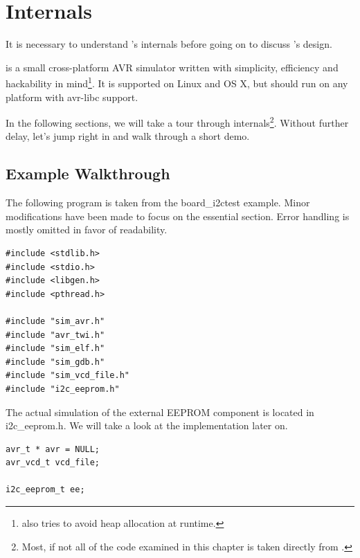 
\chapter{\simavr Internals} \label{chapter:simavr}

It is necessary to understand \simavr's internals before going on to discuss
\qsimavr's design.

\simavr is a small cross-platform \ac{AVR} simulator written with simplicity, efficiency and
hackability in mind\footnote{
%
\simavr also tries to avoid heap allocation at runtime.
%
}. It is supported on Linux and OS X, but should run on any
platform with avr-libc support.

In the following sections, we will take a tour through \simavr internals\footnote{
Most, if not all of the code examined in this chapter is taken directly from \simavr.}.
Without further delay, let's jump right in and walk through a short demo.


\section{\simavr Example Walkthrough} \label{section:simavr_example_walkthrough}

The following program is taken from the board\_i2ctest \simavr example. Minor
modifications have been made to focus on the essential section. Error handling
is mostly omitted in favor of readability.

\begin{lstlisting}
#include <stdlib.h>
#include <stdio.h>
#include <libgen.h>
#include <pthread.h>

#include "sim_avr.h"
#include "avr_twi.h"
#include "sim_elf.h"
#include "sim_gdb.h"
#include "sim_vcd_file.h"
#include "i2c_eeprom.h"
\end{lstlisting}

The actual simulation of the external \ac{EEPROM} component is located in
i2c\_eeprom.h. We will take a look at the implementation later on.

\begin{lstlisting}
avr_t * avr = NULL;
avr_vcd_t vcd_file;

i2c_eeprom_t ee;
\end{lstlisting}

